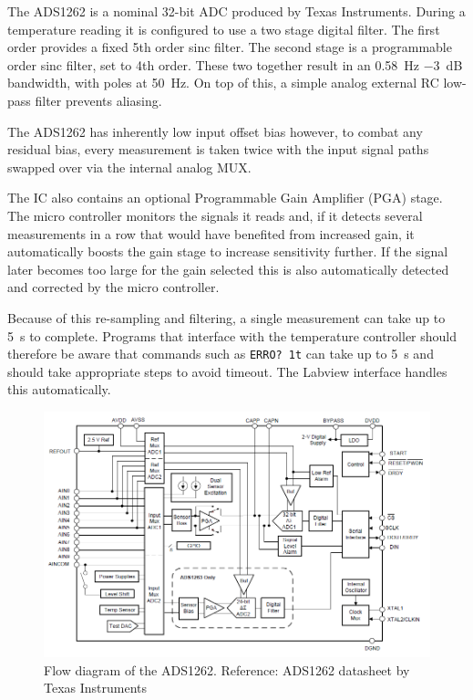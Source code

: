 \documentclass[11pt]{report}
\begin{document}
The ADS1262 is a nominal 32-bit ADC produced by Texas Instruments. During a temperature reading it is configured to use a two stage digital filter. The first order provides a fixed 5th order sinc filter. The second stage is a programmable order sinc filter, set to 4th order. These two together result in an \SI{0.58}{\Hz} \SI{-3}{\dB} bandwidth, with poles at \SI{50}{\Hz}. On top of this, a simple analog external RC low-pass filter prevents aliasing. 

The ADS1262 has inherently low input offset bias however, to combat any residual bias, every measurement is taken twice with the input signal paths swapped over via the internal analog MUX. 

The IC also contains an optional Programmable Gain Amplifier (PGA) stage. The micro controller monitors the signals it reads and, if it detects several measurements in a row that would have benefited from increased gain, it automatically boosts the gain stage to increase sensitivity further. If the signal later becomes too large for the gain selected this is also automatically detected and corrected by the micro controller. 

Because of this re-sampling and filtering, a single measurement can take up to \SI{5}{\second} to complete. Programs that interface with the temperature controller should therefore be aware that commands such as {\tt ERRO? 1t} can take up to \SI{5}{\second} and should take appropriate steps to avoid timeout. The Labview interface handles this automatically. 

\begin{figure}[h!]
	\centering
	\includegraphics[width=\textwidth]{ADS_diagram}
	\caption{Flow diagram of the ADS1262. Reference: ADS1262 datasheet by Texas Instruments}
	\label{fig:ADS_Flow}
\end{figure}
\end{document}
